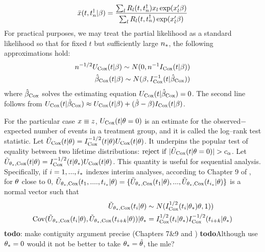 \begin{align}\label{coxscorecompensator}
\bar {x}(t,t^{\dag}_n|\beta)=\frac{\sum_l R_l(t,t^{\dag}_n)x_l\exp(x_l'\beta)}{\sum_l R_l(t,t^{\dag}_n)\exp(x_l'\beta)}
\end{align}For practical purposes, we may treat the partial likelihood as a standard likelihood so that for fixed $t$ but sufficiently large $n_*$, the following approximations hold: 
\begin{align}\label{coxscoreapprox_1}
n^{-1/2}U_{\mathrm{Cox}}(t|\beta)\sim N(0,n^{-1}I_{\mathrm{Cox}}(t|\beta))\\
\hat{\beta}_{\mathrm{Cox}}(t|\beta)\sim N(\beta,I_{\mathrm{Cox}}^{-1}(t|\hat{\beta}_{\mathrm{Cox}}))
\end{align}where $\hat{\beta}_{\mathrm{Cox}}$ solves the estimating equation $U_{\mathrm{Cox}}(t|\hat{\beta}_{\mathrm{Cox}})=0$. The second line follows from $U_{\mathrm{Cox}}(t|\hat{\beta}_{\mathrm{Cox}})\approx U_{\mathrm{Cox}}(t|\beta)+(\hat{\beta}-\beta)I_{\mathrm{Cox}}(t|\beta)$.

For the particular case $x\equiv z$, $U_{\mathrm{Cox}}(t|\theta=0)$ is an estimate for the  observed$-$expected number of events in a  treatment group, and it is called the log--rank test statistic. Let $\tilde{U}_{\mathrm{Cox}}(t|\theta)=I_{\mathrm{Cox}}^{-1/2}(t|\theta)U_{\mathrm{Cox}}(t|\theta)$. It underpins the popular test of equality between two lifetime distributions: $\mathrm{reject\ if\ }|\coxscorescaled(t|\treateffect=0)|>c_\alpha$. Let $\tilde{U}_{\theta_*,\mathrm{Cox}}(t|\theta)=I_{\mathrm{Cox}}^{-1/2}(t|\theta_*)U_{\mathrm{Cox}}(t|\theta)$. This quantity is useful for sequential analysis. Specifically, if $i=1,...,i_*$ indexes interim analyses, according to Chapter 9 of \cite{2004Ibrahim}, for $\theta$ close to $0$, $\tilde{U}_{\theta_*,\mathrm{Cox}}(t_1,....,t_{i_*}|\theta)=\{\tilde{U}_{\theta_*,\mathrm{Cox}}(t_1|\theta),...,\tilde{U}_{\theta_*,\mathrm{Cox}}(t_{i_*}|\theta)\}$ is a normal vector such that
\begin{align}\label{coxscorescaledapproxdist}
\tilde{U}_{\theta_*,\mathrm{Cox}}(t_i|\theta)&\sim N(I_{\mathrm{Cox}}^{1/2}(t_i|\theta_*)\theta,1))\\\label{coxscorescaledapproxdist2}
\mathrm{Cov}(\tilde{U}_{\theta_*,\mathrm{Cox}}(t_i|\theta),\tilde{U}_{\theta_*,\mathrm{Cox}}(t_{i+k}|\theta))|\theta_*&=I_{\mathrm{Cox}}^{1/2}(t_i|\theta_*)I_{\mathrm{Cox}}^{-1/2}(t_{i+k}|\theta_*)
\end{align}\textbf{todo}: make contiguity argument precise (Chapters 7\&9\cite{1998Vaart} and \cite{1997Bilias}) \textbf{todo}Although \cite{2004Ibrahim} use $\theta_*=0$ would it not be better to take $\theta_*=\hat{\theta}$, the mle?

